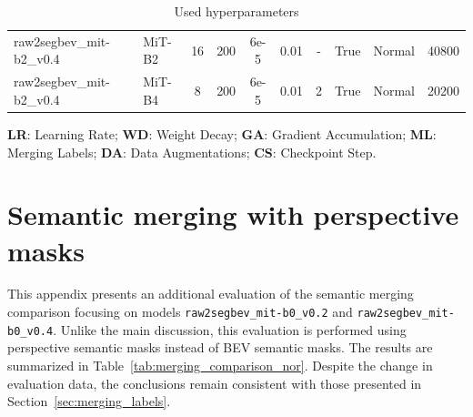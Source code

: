 \begin{table}[!ht]
\begin{threeparttable}
\begin{tabular}{l l | c c c c c c c c}
            raw2segbev\_mit-b2\_v0.4 & MiT-B2 & 16 & 200 & 6e-5 & 0.01 & - & True & Normal & 40800 \\

            raw2segbev\_mit-b2\_v0.4 & MiT-B4 & 8 & 200 & 6e-5 & 0.01 & 2 & True & Normal & 20200 \\

            \bottomrule
        \end{tabular}
        \begin{tablenotes} %
            \item[] \textbf{LR}: Learning Rate; \textbf{WD}: Weight Decay; \textbf{GA}: Gradient Accumulation; \textbf{ML}: Merging Labels; \textbf{DA}: Data Augmentations; \textbf{CS}: Checkpoint Step.
        \end{tablenotes} %
    \end{threeparttable} %

    \caption{Used hyperparameters}
    \label{tab:models_hyperparameters}
\end{table}
\newpage


\section{Semantic merging with perspective masks}
This appendix presents an additional evaluation of the semantic merging comparison focusing on models \texttt{raw2segbev\_mit-b0\_v0.2} and \texttt{raw2segbev\_mit-b0\_v0.4}. Unlike the main discussion, this evaluation is performed using perspective semantic masks instead of BEV semantic masks. The results are summarized in Table~\ref{tab:merging_comparison_nor}. Despite the change in evaluation data, the conclusions remain consistent with those presented in Section~\ref{sec:merging_labels}.

